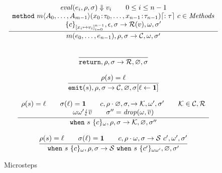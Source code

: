 \begin{figure}
$$\begin{array}{c}
      \cfrac{
      \begin{array}{c}
        \eval{e_i}{\env}{\heap} \Downarrow v_i \qquad 0\leq i \leq n-1                                                                                 \\
        {\tt{method}}~m\langle A_0,\ldots,A_{m-1}\rangle(\field{x_0}{\tau_0},\ldots,\field{x_{n-1}}{\tau_{n-1}})\lceil :\tau\rceil~c \in {\mathit{Methods}} \\
        \{c\}_{[x_i \mapsto v_i]_{i=0}^{n-1}},\epsilon, \heap \rightarrow \ret(v), \omega, \heap'
      \end{array}
      }{
      m(e_0,\ldots,e_{n-1}), \env, \heap \rightarrow \continue, \omega, \heap'
      }
      \\\\
      \cfrac{

      }{
        \return,\env,\heap \rightarrow \mathcal{R},\varnothing,\heap
      }
      \\\\
      \cfrac{
        \rho(s) = \ell  
      }{
        \emit(s),\env,\heap \rightarrow \mathcal{C},\varnothing,\heap[\ell \leftarrow \present]
      }
      \\\\
      \cfrac{
        \begin{array}{c}
          \env(s) = \ell \qquad \sigma(\ell) = \present
          \qquad c,\env\cdot \varnothing,\heap,\rightarrow \mathcal{K},\omega',\heap'
          \qquad \mathcal{K} \in \continue,\ret \\
          \omega\omega' \lightning \overline{v} \qquad
          \sigma'' = {\mathit{drop}}(\omega,\overline{v})
        \end{array}
      }{
        \when{s}{\{c\}_\omega},\env,\heap\rightarrow
        \mathcal{K},\varnothing,\heap''
      }
      \\\\
      \cfrac{
      \env(s) = \ell \qquad \sigma(\ell) = \present \qquad
      c,\env \cdot \omega,\heap \rightarrow \suspend~c',\omega',\heap'
      }
      {
      \when{s}{\{c\}_\omega},\env,\heap\rightarrow
      \suspend~\when{s}{\{c'\}_{\omega\omega'}},\varnothing,\heap'
      }
    \end{array}
  $$
  \caption{Microsteps}
  \label{fig:sem2}
\end{figure}
